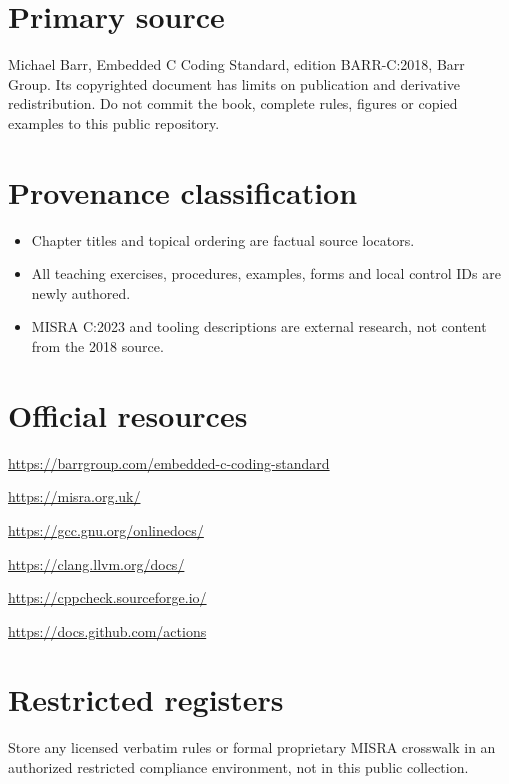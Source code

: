 \documentclass[10pt,letterpaper]{article}
\begin{document}
\makedoctitle
\makedocsummary
\section{Primary source}
Michael Barr, Embedded C Coding Standard, edition BARR-C:2018, Barr Group. Its copyrighted document has limits on publication and derivative redistribution. Do not commit the book, complete rules, figures or copied examples to this public repository.
\section{Provenance classification}
\begin{itemize}
\item Chapter titles and topical ordering are factual source locators.
\item All teaching exercises, procedures, examples, forms and local control IDs are newly authored.
\item MISRA C:2023 and tooling descriptions are external research, not content from the 2018 source.
\end{itemize}

\section{Official resources}
\url{https://barrgroup.com/embedded-c-coding-standard}

\url{https://misra.org.uk/}

\url{https://gcc.gnu.org/onlinedocs/}

\url{https://clang.llvm.org/docs/}

\url{https://cppcheck.sourceforge.io/}

\url{https://docs.github.com/actions}
\section{Restricted registers}
Store any licensed verbatim rules or formal proprietary MISRA crosswalk in an authorized restricted compliance environment, not in this public collection.
\end{document}

